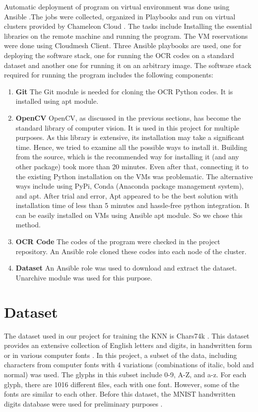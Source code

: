 \documentclass[9pt,twocolumn,twoside]{../../styles/osajnl}
\begin{document}
Automatic deployment of program on virtual environment was done using
Ansible \cite{www-ansible} .The jobs were collected, organized in 
Playbooks \cite{www-ansible-playbook} and run on virtual clusters provided
by Chameleon Cloud \cite{www-chameleoncloud}.
The tasks include Installing the essential libraries on the remote machine
and running the program.
The VM reservations were done using Cloudmesh Client. Three Ansible playbooks are used, one for 
deploying the software stack, one for running the OCR codes on a standard dataset
and another one for running it on an arbitrary image. The software stack
required for running the program includes the following components:
\begin{enumerate}
\item {\bfseries Git} The Git module is needed for cloning the OCR Python codes. 
It is installed using apt module.
\item{\bfseries OpenCV} OpenCV, as discussed in the previous sections, has become 
the standard library of computer vision. It is used in this project for multiple 
purposes. As this library is extensive, its installation may take a significant time.
Hence, we tried to examine all the possible ways to install it. Building from the source,
which is the recommended way for installing it (and any other package) took more than
20 minutes. Even after that, connecting it to the existing Python installation on the
VMs was problematic. The alternative ways include using PyPi, Conda (Anaconda package
management system), and apt. After trial and error, Apt appeared to be the best solution
with installation time of less than 5 minutes and hassle-free python integration. It can 
be easily installed on VMs using Ansible apt module. So we chose this method.
\item {\bfseries OCR Code} The codes of the program were checked in the project
repository. An Ansible role cloned these codes into each node of the cluster.
\item{\bfseries Dataset} An Ansible role was used to download and extract the
dataset. Unarchive module was used for this purpose.
\end{enumerate}


\section{Dataset}
The dataset used in our project for training the KNN is Chars74k \cite{chars74k-dataset}.
This dataset provides an extensive collection of English letters and digits, 
in handwritten form or in various computer fonts \cite{de2009character}. In this project, a subset 
of the data, including characters from computer fonts with 4 variations (combinations
of italic, bold and normal) was used. The glyphs in this subset include 0-9, A-Z, and a-z.
For each glyph, there are 1016 different files, each with one font. However, some of the fonts
are similar to each other.
\newline
Before this dataset, the MNIST handwritten digits database were used for preliminary 
purposes \cite{mnist-dataset}.
\end{document}

